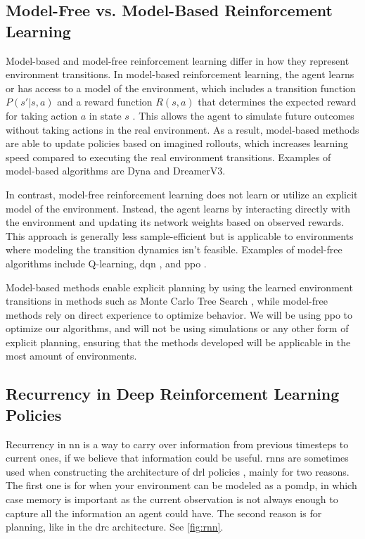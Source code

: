 \documentclass[UKenglish]{uiomasterthesis}
\begin{document}
\subsection{Model-Free vs. Model-Based Reinforcement Learning}
Model-based and model-free reinforcement learning differ in how they represent environment transitions. In model-based reinforcement learning, the agent learns or has access to a model of the environment, which includes a transition function \( P(s' | s, a) \) and a reward function \( R(s, a) \) that determines the expected reward for taking action \( a \) in state \( s \) \cite{moerland2022modelbasedreinforcementlearningsurvey}. This allows the agent to simulate future outcomes without taking actions in the real environment. As a result, model-based methods are able to update policies based on imagined rollouts, which increases learning speed compared to executing the real environment transitions. Examples of model-based algorithms are Dyna\cite{10.1145/122344.122377} and DreamerV3\cite{hafner2024masteringdiversedomainsworld}.

In contrast, model-free reinforcement learning does not learn or utilize an explicit model of the environment. Instead, the agent learns by interacting directly with the environment and updating its network weights based on observed rewards. This approach is generally less sample-efficient but is applicable to environments where modeling the transition dynamics isn't feasible. Examples of model-free algorithms include Q-learning, \ac{dqn} \cite{mnih2013playingatarideepreinforcement}, and \ac{ppo} \cite{schulman2017proximalpolicyoptimizationalgorithms}.

Model-based methods enable explicit planning by using the learned environment transitions in methods such as Monte Carlo Tree Search \cite{_wiechowski_2022}, while model-free methods rely on direct experience to optimize behavior. We will be using \ac{ppo} to optimize our algorithms, and will not be using simulations or any other form of explicit planning, ensuring that the methods developed will be applicable in the most amount of environments.

\subsection{Recurrency in Deep Reinforcement Learning Policies}
Recurrency in \ac{nn} is a way to carry over information from previous timesteps to current ones, if we believe that information could be useful. \acp{rnn} are sometimes used when constructing the architecture of \ac{drl} policies \cite{hausknecht2017deeprecurrentqlearningpartially}, mainly for two reasons. The first one is for when your environment can be modeled as a \ac{pomdp}, in which case memory is important as the current observation is not always enough to capture all the information an agent could have. The second reason is for planning, like in the \ac{drc} architecture\cite{guez2019investigationmodelfreeplanning}. See \cref{fig:rnn}.
\end{document}
